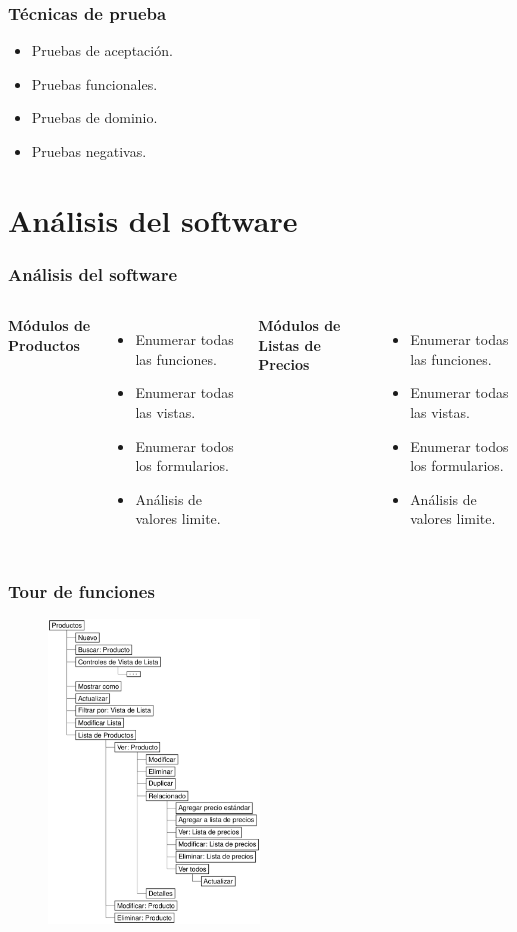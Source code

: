 \documentclass{beamer}
\begin{document}
\begin{frame}
\frametitle{Técnicas de prueba}
\begin{itemize}
\item Pruebas de aceptación.
\item Pruebas funcionales.
\item Pruebas de dominio.
\item Pruebas negativas.
\end{itemize}
\end{frame}

\section{Análisis del software}

\begin{frame}
\frametitle{Análisis del software}
\begin{columns}
\small{
\textbf{Módulos de Productos}
\begin{itemize}
\item Enumerar todas las funciones.
\item Enumerar todas las vistas.
\item Enumerar todos los formularios.
\item Análisis de valores limite.
\end{itemize}}
\small{
\textbf{Módulos de Listas de Precios}
\begin{itemize}
\item Enumerar todas las funciones.
\item Enumerar todas las vistas.
\item Enumerar todos los formularios.
\item Análisis de valores limite.
\end{itemize}}
\end{columns}
\end{frame}

\begin{frame}
\frametitle{Tour de funciones}
\begin{figure}
\centering
\includegraphics[width=0.5\textwidth]{graphics/figure0.eps}
\end{figure}
\end{frame}
\end{document}
